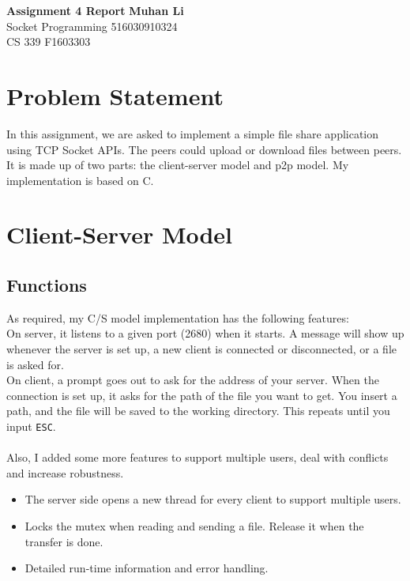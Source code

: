 \documentclass[a4paper, 11pt]{article}
\begin{document}
\noindent
\large\textbf{Assignment 4 Report} \hfill \textbf{Muhan Li} \\
\normalsize Socket Programming \hfill 516030910324 \\
CS 339 \hfill F1603303

\section*{Problem Statement}
In this assignment, we are asked to implement a simple file share application using TCP Socket APIs. The peers could upload or download files between peers. It is made up of two parts: the client-server model and p2p model. My implementation is based on C.

\section*{Client-Server Model}
\subsection*{Functions}
As required, my C/S model implementation has the following features:\\
On server, it listens to a given port (2680) when it starts. A message will show up whenever the server is set up, a new client is connected or disconnected, or a file is asked for.\\
On client, a prompt goes out to ask for the address of your server. When the connection is set up, it asks for the path of the file you want to get. You insert a path, and the file will be saved to the working directory. This repeats until you input \texttt{ESC}.\\
\\
Also, I added some more features to support multiple users, deal with conflicts and increase robustness.
\begin{itemize}
    \item The server side opens a new thread for every client to support multiple users.
    \item Locks the mutex when reading and sending a file. Release it when the transfer is done.
    \item Detailed run-time information and error handling.
\end{itemize}
\end{document}
